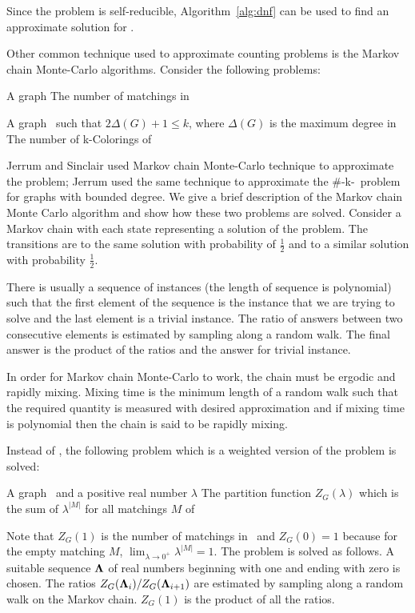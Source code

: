 Since the  problem is self-reducible, Algorithm~\ref{alg:dnf} can
be used to find an approximate solution for \@.

Other common technique used to approximate counting problems is the Markov chain
Monte-Carlo algorithms. Consider the following problems:

{A graph \mG}
{The number of matchings in \mG}

\newcommand{\ldkcol}{\#\pname{LowDegree}-k-\pname{Coloring}}
\pdef{\ldkcol}
{A graph \mG\ such that \(2\Delta(G)+1\le k\), where \(\Delta(G)\)
is the maximum degree in \mG}
{The number of k-Colorings of \mG}

Jerrum and Sinclair \cite{Jerrum96} used Markov chain Monte-Carlo technique 
to approximate the  problem; Jerrum \cite{Jerrum} used the same technique 
to approximate the \ldkcol\ problem for graphs 
with bounded degree. We give a brief description of the Markov chain Monte Carlo algorithm
and show how these two problems are solved.
Consider a Markov chain with each state representing a solution of the problem.
The transitions are to the same solution with probability of \(\frac{1}{2}\) 
and to a similar solution with probability \(\frac{1}{2}\).

There is usually a sequence of instances (the length of sequence is polynomial) such that
the first element of the sequence is the instance  that we are trying to solve
and the last element is a trivial instance.
The ratio of answers between two consecutive elements 
is estimated by sampling along a random walk.
The final answer is the product of the ratios and the answer for trivial instance. 

In order for Markov chain Monte-Carlo to work, the chain must be ergodic and rapidly mixing.
Mixing time is the minimum length of a random walk such that the required
quantity is measured with desired approximation and if mixing
time is polynomial then the chain is said to be rapidly mixing.

Instead of , the following problem which is a weighted version of
the  problem is solved:

{A graph \mG\ and a positive real number \(\lambda\)}
{The partition function \(Z_G(\lambda)\) which is the sum of
\(\lambda^{|M|}\) for all matchings \(M\) of \mG}

Note that \(Z_G(1)\) is the number of matchings in \mG\ and \(Z_G(0)=1\) because
for the empty matching \(M\), \(\lim_{\lambda\to 0^+}\lambda^{|M|}=1\).
The  problem is solved as follows.
A suitable sequence \(\mathbf{\Lambda}\) of real numbers beginning with one and ending
with zero is chosen. The ratios \(Z_G(\mathbf{\Lambda}_i)/Z_G(\mathbf{\Lambda}_{i+1})\) are estimated 
by sampling along a random walk on the Markov chain. \(Z_G(1)\) is the product of
all the ratios.

